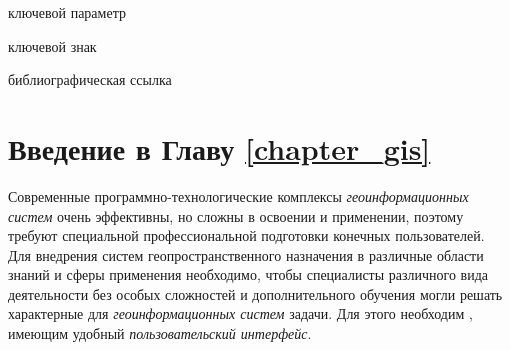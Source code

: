 \begin{SCn}
\begin{scnrelfromlist}{ключевой параметр}
\end{scnrelfromlist}

\begin{scnrelfromlist}{ключевой знак}
\end{scnrelfromlist}

\bigskip

\begin{scnrelfromlist}{библиографическая ссылка}
\end{scnrelfromlist}
\end{SCn}

\section*{Введение в Главу \ref{chapter_gis}}

Современные программно-технологические комплексы \textit{геоинформационных систем} очень эффективны, но сложны в освоении и применении, поэтому требуют специальной профессиональной подготовки конечных пользователей. Для внедрения систем геопространственного назначения в различные области знаний и сферы применения необходимо, чтобы специалисты различного вида деятельности без особых сложностей и дополнительного обучения могли решать характерные для \textit{геоинформационных систем} задачи. Для этого необходим , имеющим удобный \textit{пользовательский интерфейс}.

